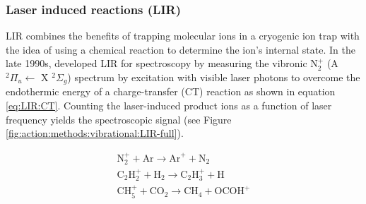 \subsubsection{Laser induced reactions (LIR)}
\label{subsec:action:methods:vibrational:LIR}

LIR combines the benefits of trapping molecular ions in a cryogenic ion trap with the idea of using a chemical reaction to determine the ion's internal state. In the late 1990s, \citet{schlemmer_laser_1999} developed LIR for spectroscopy by measuring the vibronic N$_2^+$ (A $ ^2\Pi_u \leftarrow$ X $^2\Sigma_g$) spectrum by excitation with visible laser photons to overcome the endothermic energy of a charge-transfer (CT) reaction as shown in equation \ref{eq:LIR:CT}. Counting the laser-induced product ions as a function of laser frequency yields the spectroscopic signal (see Figure \ref{fig:action:methods:vibrational:LIR-full}).

\begin{align}
    \text{N}_2^+ + \text{Ar} \rightarrow \text{Ar}^+ + \text{N}_2 \label{eq:LIR:CT}\\
    \text{C}_2\text{H}_2^+ + \text{H}_2 \rightarrow \text{C}_2\text{H}_3^+ + \text{H} \label{eq:LIR:H2_abstraction}\\
    \text{CH}_5^+ + \text{CO}_2 \rightarrow \text{CH}_4 + \text{OCOH}^+  \label{eq:LIR:proton_transfer}
\end{align}


